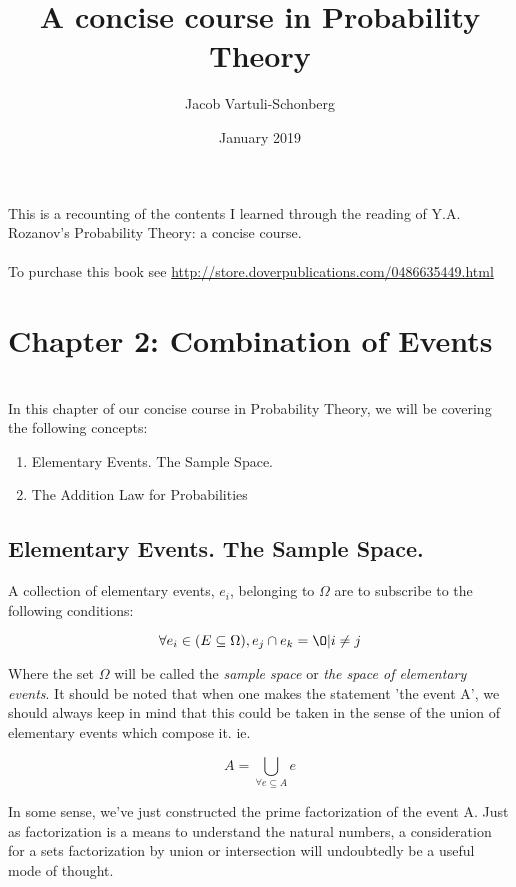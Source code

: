 \documentclass{article}
\title{A concise course in Probability Theory}
\author{Jacob Vartuli-Schonberg}
\date{January 2019}
\begin{document}
\maketitle
This is a recounting of the contents I learned through the reading of Y.A. Rozanov's Probability Theory: a concise course. \\
\\
To purchase this book see \url{http://store.doverpublications.com/0486635449.html}
\section{Chapter 2: Combination of Events}
\\
In this chapter of our concise course in Probability Theory, we will be covering the following concepts:
\begin{enumerate}
\item Elementary Events. The Sample Space.
\item The Addition Law for Probabilities
\end{enumerate}

\subsection{Elementary Events. The Sample Space.}
A collection of elementary events, \(e_i\), belonging to \(\Omega\) are to subscribe to the following conditions:

\[\forall e_i \in (E \subseteq \Omega), e_j \cap e_k = \O | i \neq j\]

Where the set \(\Omega\) will be called the \textit{sample space} or \textit{the space of elementary events}. It should be noted that when one makes the statement 'the event A', we should always keep in mind that this could be taken in the sense of the union of elementary events which compose it. ie.

\[A = \bigcup_{\forall e \subseteq A} e\]

In some sense, we've just constructed the prime factorization of the event A. Just as factorization is a means to understand the natural numbers, a consideration for a sets factorization by union or intersection will undoubtedly be a useful mode of thought.
\end{document}
